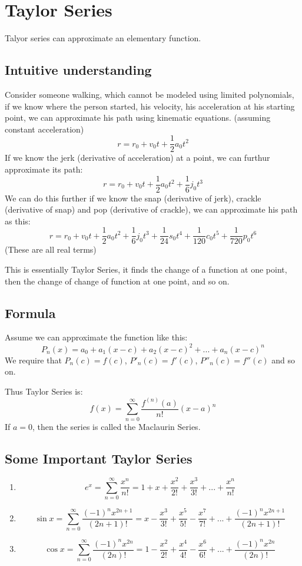 \documentclass{article}
\numberwithin{equation}{section}
\begin{document}
\newpage
\section{Taylor Series}
Talyor series can approximate an elementary function.

\subsection{Intuitive understanding}
Consider someone walking, which cannot be modeled using limited polynomials, if we know where the person started, his velocity, his acceleration at his starting point, we can approximate his path using kinematic equations.
(assuming constant acceleration)
\[
    r = r_0 + v_0t + \frac{1}{2}a_0t^2
\]
If we know the jerk (derivative of acceleration) at a point, we can furthur approximate its path:
\[
    r = r_0 + v_0t + \frac{1}{2}a_0t^2 + \frac{1}{6} j_0 t^3
\]
We can do this further if we know the snap (derivative of jerk), crackle (derivative of snap) and pop (derivative of crackle), we can approximate his path as this:
\[
    r = r_0 + v_0t + \frac{1}{2}a_0 t^2 + \frac{1}{6} j_0 t^3 + \frac{1}{24} s_0 t^4 + \frac{1}{120} c_0 t^5 + \frac{1}{720} p_0 t^6
\]
(These are all real terms)

This is essentially Taylor Series, it finds the change of a function at one point, then the change of change of function at one point, and so on.

\subsection{Formula}
Assume we can approximate the function like this:
\[
    P_n(x) = a_0 + a_1 (x-c) + a_2 (x-c)^2 + ... + a_n (x-c)^n
\]
We require that $P_n(c) = f(c)$, $P'_n(c) = f'(c)$, $P''_n(c) = f''(c)$ and so on.

Thus Taylor Series is:
\[
    f(x) = \sum_{n = 0}^{\infty} \frac{f^{(n)}(a)}{n!}(x-a)^n
\]
If $a=0$, then the series is called the Maclaurin Series.

\subsection{Some Important Taylor Series}
\begin{enumerate}
    \item 
    \[
    e^x = \sum_{n=0}^{\infty} \frac{x^n}{n!} = 1 + x + \frac{x^2}{2!} + \frac{x^3}{3!} + ... + \frac{x^n}{n!}
    \]
    \item 
    \[
    \sin x = \sum_{n=0}^{\infty} \frac{(-1)^nx^{2n+1}}{(2n+1)!} = x - \frac{x^3}{3!} + \frac{x^5}{5!} - \frac{x^7}{7!} + ... + \frac{(-1)^nx^{2n+1}}{(2n+1)!}
    \]
    \item 
    \[
    \cos x = \sum_{n=0}^{\infty} \frac{(-1)^n x^{2n}}{(2n)!} = 1 - \frac{x^2}{2!} + \frac{x^4}{4!} - \frac{x^6}{6!} + ... + \frac{(-1)^n x^{2n}}{(2n)!}
    \]
\end{enumerate}
\end{document}
